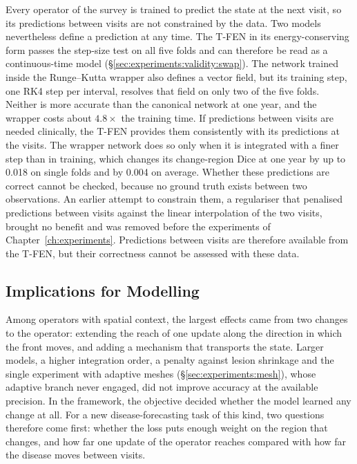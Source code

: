 Every operator of the survey is trained to predict the state at the next
visit, so its predictions between visits are not constrained by the data.
Two models nevertheless define a prediction at any time. The T-FEN in its
energy-conserving form passes the step-size test on all five folds and can therefore be read as a continuous-time model
(\S\ref{sec:experiments:validity:swap}). The network trained inside the
Runge--Kutta wrapper also defines a vector field, but its training step,
one RK4 step per interval, resolves that field on only two of the five
folds. Neither is more accurate than the canonical network at one year,
and the wrapper costs about $4.8\times$ the training time. If predictions
between visits are needed clinically, the T-FEN provides them consistently
with its predictions at the visits. The wrapper network does so only when
it is integrated with a finer step than in training, which changes its
change-region Dice at one year by up to 0.018 on single folds and by 0.004
on average. Whether these predictions are
correct cannot be checked, because no ground truth exists between two
observations. An earlier attempt to constrain them, a regulariser that
penalised predictions between visits against the linear interpolation of
the two visits, brought no benefit and was removed before the experiments
of Chapter~\ref{ch:experiments}. Predictions between visits are therefore
available from the T-FEN, but their correctness cannot be assessed with
these data.

\subsection{Implications for Modelling}
\label{sec:discussion:implications}

Among operators with spatial context, the largest effects came from two
changes to the operator: extending the reach of one update along the direction in which
the front moves, and adding a mechanism that transports the state. Larger
models, a higher integration order, a penalty against lesion shrinkage and
the single experiment with adaptive meshes (\S\ref{sec:experiments:mesh}),
whose adaptive branch never engaged, did not improve accuracy at the
available precision.
In the framework, the objective decided whether the model learned any
change at all. For a new disease-forecasting task of this kind, two
questions therefore come first: whether the loss puts enough weight on the
region that changes, and how far one update of the operator reaches
compared with how far the disease moves between visits.


